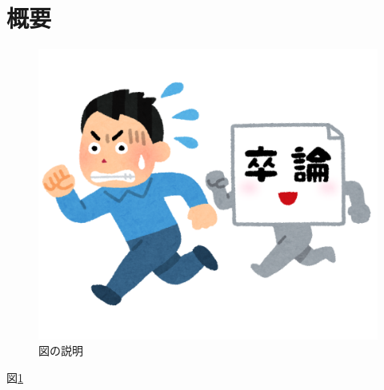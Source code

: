 \section*{概要}
\begin{figure}[hbtp]
    \centering
    \includegraphics[keepaspectratio, width=0.5\linewidth]
    {./images/image.png}
    \caption{図の説明}
    \label{fig:ID}
\end{figure}

図\ref{fig:ID}
